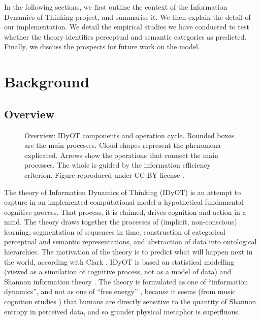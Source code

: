 \documentclass[runningheads]{llncs}
\begin{document}
In the following sections, we first outline the context of the Information Dynamics of Thinking project, and summarise it. We then explain the detail of our implementation. We detail the empirical studies we have conducted to test whether the theory identifies perceptual and semantic categories as predicted. Finally, we discuss the prospects for future work on the model.
\section{Background}
\subsection{Overview}
\begin{figure}[t]
    \centering
    \caption{Overview: IDyOT components and operation cycle. Rounded boxes are the main processes. Cloud shapes represent the phenomena explicated. Arrows show the operations that connect the main processes. The whole is guided by the information efficiency criterion. Figure  reproduced under CC-BY license \cite{WigginsSanjekdar19}.}
    \label{fig:IDyOToverview}
\end{figure}
The theory of Information Dynamics of Thinking (IDyOT) is an attempt to capture in an implemented computational model a hypothetical fundamental cognitive process. That process, it is claimed, drives cognition and action in a mind. The theory draws together the processes of (implicit, non-conscious) learning, segmentation of sequences in time, construction of categorical perceptual and semantic representations, and abstraction of data into ontological hierarchies. The motivation of the theory is to predict what will happen next in the world, according with Clark \cite{Clark13}. IDyOT is based on statistical modelling (viewed as a simulation of cognitive process, not as a model of data) and Shannon information theory \citep{Shannon48}. The theory is formulated as one of ``information dynamics'', and not as one of ``free energy''  \citep{Friston10}, because it seems (from music cognition studies  \citep{Huron06,PearceWiggins12,HansenPearce14}) that humans are directly sensitive to the quantity of Shannon entropy in perceived data, and so  grander physical metaphor is superfluous.
\end{document}
